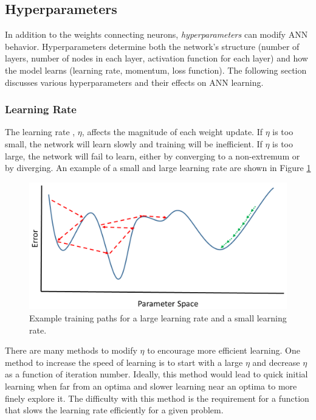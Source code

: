 \subsection{Hyperparameters}

In addition to the weights connecting neurons, \textit{hyperparameters} can modify ANN behavior. Hyperparameters determine both the network's structure (number of layers, number of nodes in each layer, activation function for each layer) and how the model learns (learning rate, momentum, loss function). The following section discusses various hyperparameters and their effects on ANN learning.

\subsubsection{Learning Rate} \label{LearningRateSubsection}

The learning rate , $\eta$, affects the magnitude of each weight update. If $\eta$ is too small, the network will learn slowly and training will be inefficient. If $\eta$ is too large, the network will fail to learn, either by converging to a non-extremum or by diverging. An example of a small and large learning rate are shown in Figure \ref{fig:Learning_rate_comparison} 

\begin{figure}[H]
	\centering
	\includegraphics[width=0.8\linewidth]{images/Learning_rate_comparison_v2}
	\caption{Example training paths for a large learning rate and a small learning rate.}
	\label{fig:Learning_rate_comparison}
\end{figure}


There are many methods to modify $\eta$ to encourage more efficient learning. One method to increase the speed of learning is to start with a large $\eta$ and decrease $\eta$ as a function of iteration number. Ideally, this method would lead to quick initial learning when far from an optima and slower learning near an optima to more finely explore it. The difficulty with this method is the requirement for a function that slows the learning rate efficiently for a given problem.

